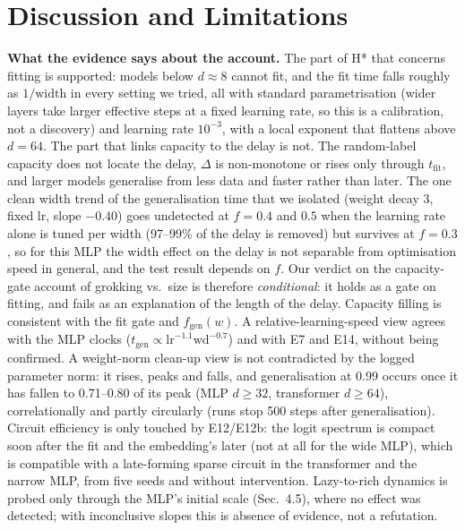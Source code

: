 \documentclass{article}
\begin{document}
\section{Discussion and Limitations}
\textbf{What the evidence says about the account.} The part of H* that concerns fitting is supported: models below $d\approx8$ cannot fit, and the fit time falls roughly as $1/\text{width}$ in every setting we tried, all with standard parametrisation (wider layers take larger effective steps at a fixed learning rate, so this is a calibration, not a discovery) and learning rate $10^{-3}$, with a local exponent that flattens above $d=64$. The part that links capacity to the delay is not. The random-label capacity does not locate the delay, $\Delta$ is non-monotone or rises only through $t_{\mathrm{fit}}$, and larger models generalise from less data and faster rather than later. The one clean width trend of the generalisation time that we isolated (weight decay 3, fixed lr, slope $-0.40$) goes undetected at $f=0.4$ and $0.5$ when the learning rate alone is tuned per width (97--99\% of the delay is removed) but survives at $f=0.3$, so for this MLP the width effect on the delay is not separable from optimisation speed in general, and the test result depends on $f$. Our verdict on the capacity-gate account of grokking vs.\ size is therefore \emph{conditional}: it holds as a gate on fitting, and fails as an explanation of the length of the delay. Capacity filling \citep{morris2025memorize} is consistent with the fit gate and $f_{\mathrm{gen}}(w)$. A relative-learning-speed view \citep{davies2023unifying} agrees with the MLP clocks ($t_{\mathrm{gen}}\propto \mathrm{lr}^{-1.1}\mathrm{wd}^{-0.7}$) and with E7 and E14, without being confirmed. A weight-norm clean-up view \citep{liu2023omnigrok,nanda2023progress} is not contradicted by the logged parameter norm: it rises, peaks and falls, and generalisation at 0.99 occurs once it has fallen to 0.71--0.80 of its peak (MLP $d\ge32$, transformer $d\ge64$), correlationally and partly circularly (runs stop 500 steps after generalisation). Circuit efficiency \citep{varma2023explaining} is only touched by E12/E12b: the logit spectrum is compact soon after the fit and the embedding's later (not at all for the wide MLP), which is compatible with a late-forming sparse circuit in the transformer and the narrow MLP, from five seeds and without intervention. Lazy-to-rich dynamics \citep{kumar2024grokking} is probed only through the MLP's initial scale (Sec.~4.5), where no effect was detected; with inconclusive slopes this is absence of evidence, not a refutation.
\end{document}
